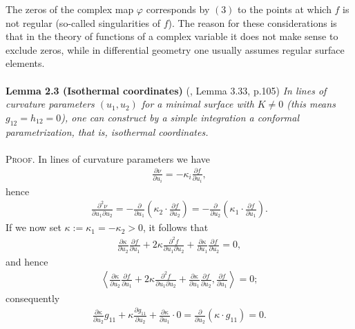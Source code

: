 \documentclass[a4paper]{article}
\numberwithin{equation}{section}
\begin{document}
The zeros of the complex map $\varphi$ corresponds by $\left(3\right)$ to the points at which $f$ is not regular (so-called singularities of $f$). The reason for these considerations is that in the theory of functions of a complex variable it does not make sense to exclude zeros, while in differential geometry one usually assumes regular surface elements.\\
\\
\textbf{Lemma 2.3 (Isothermal coordinates)} (\cite{1}, Lemma 3.33, p.105) \textit{In lines of curvature parameters $\left(u_1,u_2\right)$ for a minimal surface with $K\ne 0$ (this means $g_{12}=h_{12}=0$), one can construct by a simple integration a conformal parametrization, that is, isothermal coordinates.}\\
\\
\textsc{Proof.} In lines of curvature parameters we have
\begin{align}
\frac{{\partial \nu }}{{\partial {u_i}}} =  - {\kappa _i}\frac{{\partial f}}{{\partial {u_i}}},
\end{align}
hence
\begin{align}
\frac{{{\partial ^2}\nu }}{{\partial {u_1}\partial {u_2}}} =  - \frac{\partial }{{\partial {u_1}}}\left( {{\kappa _2} \cdot \frac{{\partial f}}{{\partial {u_2}}}} \right) =  - \frac{\partial }{{\partial {u_2}}}\left( {{\kappa _1} \cdot \frac{{\partial f}}{{\partial {u_1}}}} \right).
\end{align}
If we now set $\kappa :=\kappa _1 =-\kappa _2>0$, it follows that
\begin{align}
\frac{{\partial \kappa }}{{\partial {u_2}}}\frac{{\partial f}}{{\partial {u_1}}} + 2\kappa \frac{{{\partial ^2}f}}{{\partial {u_1}\partial {u_2}}} + \frac{{\partial \kappa }}{{\partial {u_1}}}\frac{{\partial f}}{{\partial {u_2}}} = 0,
\end{align}
and hence
\begin{align}
\left\langle {\frac{{\partial \kappa }}{{\partial {u_2}}}\frac{{\partial f}}{{\partial {u_1}}} + 2\kappa \frac{{{\partial ^2}f}}{{\partial {u_1}\partial {u_2}}} + \frac{{\partial \kappa }}{{\partial {u_1}}}\frac{{\partial f}}{{\partial {u_2}}},\frac{{\partial f}}{{\partial {u_1}}}} \right\rangle  = 0;
\end{align}
consequently
\begin{align}
\frac{{\partial \kappa }}{{\partial {u_2}}}{g_{11}} + \kappa \frac{{\partial {g_{11}}}}{{\partial {u_2}}} + \frac{{\partial \kappa }}{{\partial {u_1}}} \cdot 0 = \frac{\partial }{{\partial {u_2}}}\left( {\kappa  \cdot {g_{11}}} \right) = 0.
\end{align}
\end{document}
